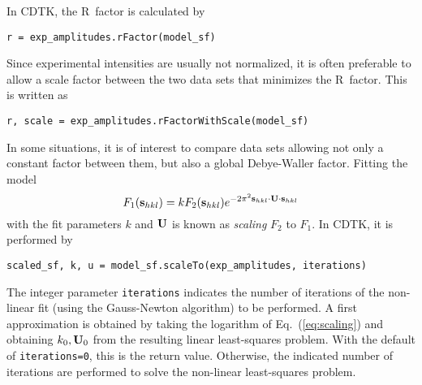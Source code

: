 \documentclass[12pt]{article}
\newcommand{\vect}[1]{{\bf #1}}
\newcommand{\mat}[1]{{\bf #1}}
\newcommand{\vs}{\vect{s}}
\newcommand{\mU}{\mat{U}}
\begin{document}
\begin{sloppy}
In CDTK, the R~factor is calculated by
\begin{verbatim}
r = exp_amplitudes.rFactor(model_sf)
\end{verbatim}
Since experimental intensities are usually not normalized, it is often
preferable to allow a scale factor between the two data sets that
minimizes the R~factor. This is written as
\begin{verbatim}
r, scale = exp_amplitudes.rFactorWithScale(model_sf)
\end{verbatim}

In some situations, it is of interest to compare data sets allowing not only
a constant factor between them, but also a global Debye-Waller factor.
Fitting the model
\begin{equation}
\label{eq:scaling}
F_1(\vs_{hkl}) = k F_2(\vs_{hkl}) e^{-2\pi^2 \vs_{hkl}\cdot\mU\cdot\vs_{hkl}}
\end{equation}
with the fit parameters $k$ and $\mU$ is known as \textit{scaling} $F_2$
to $F_1$. In CDTK, it is performed by
\begin{verbatim}
scaled_sf, k, u = model_sf.scaleTo(exp_amplitudes, iterations)
\end{verbatim}
The integer parameter \verb/iterations/ indicates the number of iterations
of the non-linear fit (using the Gauss-Newton algorithm) to be performed.
A first approximation is obtained by taking the logarithm of 
Eq.~(\ref{eq:scaling}) and obtaining $k_0, \mU_0$ from the resulting
linear least-squares problem. With the default of \verb/iterations=0/,
this is the return value. Otherwise, the indicated number of iterations
are performed to solve the non-linear least-squares problem.


\end{sloppy}
\end{document}
